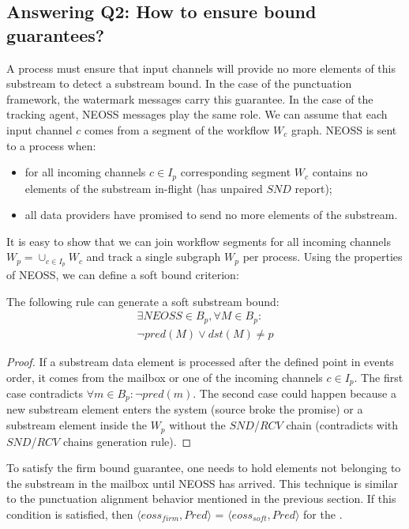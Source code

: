 \subsection{Answering Q2: How to ensure bound guarantees?}
A process must ensure that input channels will provide no more elements of this substream to detect a substream bound. In the case of the punctuation framework, the watermark messages carry this guarantee. In the case of the tracking agent, NEOSS messages play the same role. We can assume that each input channel $c$ comes from a segment of the workflow $W_c$ graph. NEOSS is sent to a process when:
\begin{itemize}
    \item for all incoming channels $c \in I_p$ corresponding segment $W_c$ contains no elements of the substream in-flight (has unpaired $SND$ report);
    \item all data providers have promised to send no more elements of the substream.
\end{itemize}
It is easy to show that we can join workflow segments for all incoming channels $W_p = \cup_{c\in I_p} W_c$ and track a single subgraph $W_p$ per process. Using the properties of NEOSS, we can define a soft bound criterion:
\begin{lemma}
The following rule can generate a soft substream bound:
\begin{multline}
 \exists NEOSS \in B_p, \forall M\in B_p : \\ \neg pred(M) \vee dst(M) \ne p
\end{multline}
\end{lemma}
\begin{proof}
If a substream data element is processed after the defined point in events order, it comes from the mailbox or one of the incoming channels $c \in I_p$. The first case contradicts $\forall m\in B_p : \neg pred(m)$. The second case could happen because a new substream element enters the system (source broke the promise) or a substream element inside the $W_p$ without the $SND$/$RCV$ chain (contradicts with $SND$/$RCV$ chains generation rule). 
\end{proof}

To satisfy the firm bound guarantee, one needs to hold elements not belonging to the substream in the mailbox until NEOSS has arrived. This technique is similar to the punctuation alignment behavior mentioned in the previous section. If this condition is satisfied, then $\langle eoss_{firm}, Pred\rangle$ = $\langle eoss_{soft}, Pred\rangle$ for the \tracker.

